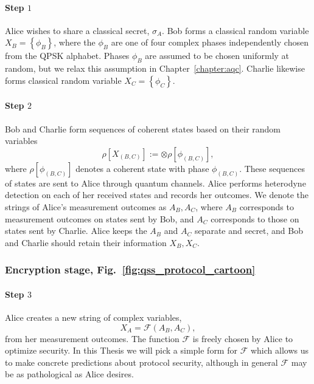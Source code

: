 \paragraph{Step $1$}
Alice wishes to share a classical secret, $\sigma_A$. Bob forms a classical random variable $X_B = \left\{\phi_B\right\}$, where the $\phi_B$ are one of four complex phases independently chosen from the QPSK alphabet. Phases $\phi_B$ are assumed to be chosen uniformly at random, but we relax this assumption in Chapter~\ref{chapter:aqc}. Charlie likewise forms classical random variable $X_C = \left\{\phi_C\right\}$.

\paragraph{Step $2$}
Bob and Charlie form sequences of coherent states based on their random variables
\begin{equation}
\rho\left[X_{\left(B, C\right)}\right] := \otimes \rho\left[\phi_{\left(B, C\right)}\right],
\end{equation}
where $\rho\left[\phi_{\left(B, C\right)}\right]$ denotes a coherent state with phase $\phi_{\left(B, C\right)}$. These sequences of states are sent to Alice through quantum channels. %
Alice performs heterodyne detection on each of her received states and records her outcomes. We denote the strings of Alice's measurement outcomes as $A_B, A_C$, where $A_B$ corresponds to measurement outcomes on states sent by Bob, and $A_C$ corresponds to those on states sent by Charlie. Alice keeps the $A_B$ and $A_C$ separate and secret, and Bob and Charlie should retain their information $X_B, X_C$.

\subsubsection*{Encryption stage, Fig.~\ref{fig:qss_protocol_cartoon}}

\paragraph{Step $3$} Alice creates a new string of complex variables,
\begin{equation}
X_A = \mathcal{F}\left(A_B, A_C\right),
\end{equation}
from her measurement outcomes. The function $\mathcal{F}$ is freely chosen by Alice to optimize security. In this Thesis we will pick a simple form for $\mathcal{F}$ which allows us to make concrete predictions about protocol security, although in general $\mathcal{F}$ may be as pathological as Alice desires.


